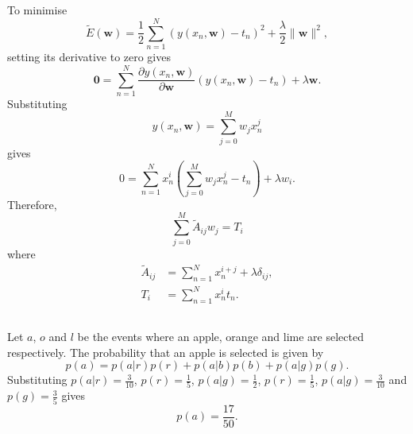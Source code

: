 \subsection{}
To minimise 
%
\begin{equation}
\tilde{E}(\mathbf{w}) = \frac{1}{2} \sum_{n = 1}^{N} \left( y(x_n, \mathbf{w}) - t_n \right) ^ 2 + \frac{\lambda}{2} \lVert \mathbf{w} \rVert ^ 2,
\end{equation}
%
setting its derivative to zero gives
%
\begin{equation}
\mathbf{0} = \sum_{n = 1}^{N} \frac{\partial y(x_n, \mathbf{w})}{\partial \mathbf{w}} \left( y(x_n, \mathbf{w}) - t_n \right) + \lambda \mathbf{w}.
\end{equation}
%
Substituting 
%
\begin{equation}
y(x_n, \mathbf{w}) = \sum_{j = 0}^{M} w_j x_n^j
\end{equation}
%
gives
%
\begin{equation}
0 = \sum_{n = 1}^{N} x_n^i \left( \sum_{j = 0}^{M} w_j x_n^j - t_n \right) + \lambda w_i.
\end{equation}
%
Therefore,
%
\begin{equation}
\sum_{j = 0}^{M} \tilde{A}_{ij} w_j = T_i
\end{equation}
%
where
%
\begin{equation}
\begin{aligned}
\tilde{A}_{ij} &= \sum_{n = 1}^{N} x_n^{i + j} + \lambda \delta_{ij}, \\
T_i &= \sum_{n = 1}^{N} x_n^i t_n.
\end{aligned}
\end{equation}


\subsection{}
Let $a$, $o$ and $l$ be the events where an apple, orange and lime are selected respectively.
The probability that an apple is selected is given by
%
\begin{equation}
p(a) = p(a | r) p(r) + p(a | b) p(b) + p(a | g) p(g).
\end{equation}
%
Substituting $p(a | r) = \frac{3}{10}$, $p(r) = \frac{1}{5}$, $p(a | g) = \frac{1}{2}$, $p(r) = \frac{1}{5}$, $p(a | g) = \frac{3}{10}$ and $p(g) = \frac{3}{5}$ gives
%
\begin{equation}
p(a) = \frac{17}{50}.
\end{equation}
%

